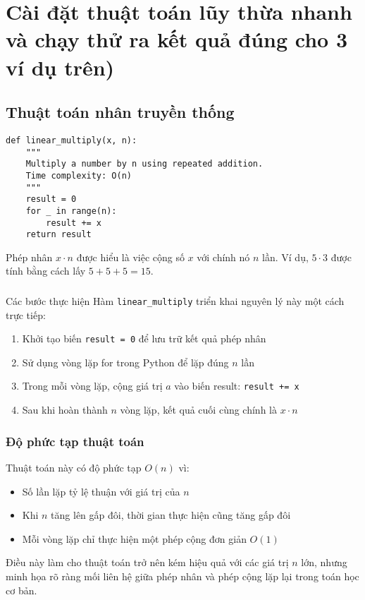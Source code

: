 \section{Cài đặt thuật toán lũy thừa nhanh và chạy thử ra kết quả
đúng cho 3 ví dụ trên)}
\subsection{Thuật toán nhân truyền thống}
\begin{verbatim}
def linear_multiply(x, n):
    """
    Multiply a number by n using repeated addition.
    Time complexity: O(n)
    """
    result = 0
    for _ in range(n):
        result += x
    return result
\end{verbatim}

Phép nhân $x \cdot n$ được hiểu là việc cộng số $x$ với chính nó $n$ lần. Ví dụ, $5 \cdot 3$ được tính bằng cách lấy $5 + 5 + 5 = 15$.

\subsubsection{}{Các bước thực hiện}
Hàm \texttt{linear\_multiply} triển khai nguyên lý này một cách trực tiếp:
\begin{enumerate}
    \item Khởi tạo biến \texttt{result = 0} để lưu trữ kết quả phép nhân
    \item Sử dụng vòng lặp for trong Python để lặp đúng $n$ lần
    \item Trong mỗi vòng lặp, cộng giá trị $a$ vào biến result: \texttt{result += x}
    \item Sau khi hoàn thành $n$ vòng lặp, kết quả cuối cùng chính là $x \cdot n$
\end{enumerate}
\subsubsection{Độ phức tạp thuật toán}
Thuật toán này có độ phức tạp $O(n)$ vì:
\begin{itemize}
   \item Số lần lặp tỷ lệ thuận với giá trị của $n$
   \item Khi $n$ tăng lên gấp đôi, thời gian thực hiện cũng tăng gấp đôi
   \item Mỗi vòng lặp chỉ thực hiện một phép cộng đơn giản $O(1)$
\end{itemize}
Điều này làm cho thuật toán trở nên kém hiệu quả với các giá trị $n$ lớn, nhưng minh họa rõ ràng mối liên hệ giữa phép nhân và phép cộng lặp lại trong toán học cơ bản.

